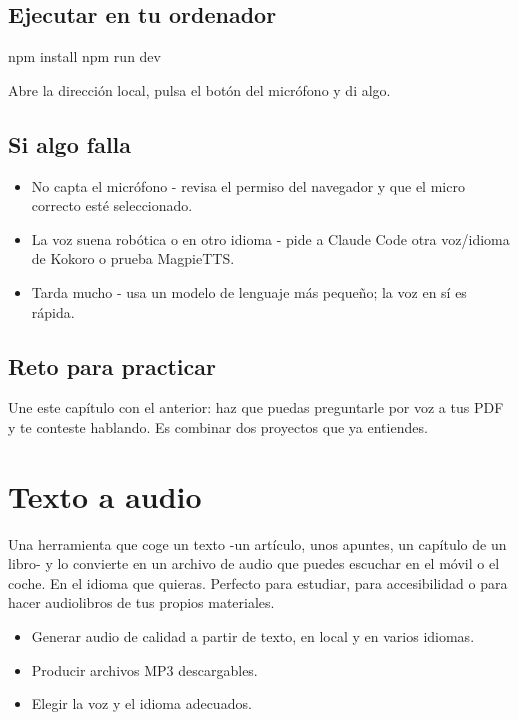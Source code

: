 \documentclass[11pt,a4paper]{book}
\begin{document}
\section{Ejecutar en tu ordenador}
\begin{codebox}
npm install
npm run dev
\end{codebox}
Abre la dirección local, pulsa el botón del micrófono y di algo.

\section{Si algo falla}
\begin{itemize}\item No capta el micrófono - revisa el permiso del navegador y que el micro correcto esté seleccionado.\end{itemize}
\begin{itemize}\item La voz suena robótica o en otro idioma - pide a Claude Code otra voz/idioma de Kokoro o prueba MagpieTTS.\end{itemize}
\begin{itemize}\item Tarda mucho - usa un modelo de lenguaje más pequeño; la voz en sí es rápida.\end{itemize}
\section{Reto para practicar}
Une este capítulo con el anterior: haz que puedas preguntarle por voz a tus PDF y te conteste hablando. Es combinar dos proyectos que ya entiendes.

\chapter{Texto a audio}
Una herramienta que coge un texto -un artículo, unos apuntes, un capítulo de un libro- y lo convierte en un archivo de audio que puedes escuchar en el móvil o el coche. En el idioma que quieras. Perfecto para estudiar, para accesibilidad o para hacer audiolibros de tus propios materiales.

\begin{itemize}\item Generar audio de calidad a partir de texto, en local y en varios idiomas.\end{itemize}
\begin{itemize}\item Producir archivos MP3 descargables.\end{itemize}
\begin{itemize}\item Elegir la voz y el idioma adecuados.\end{itemize}
\end{document}
